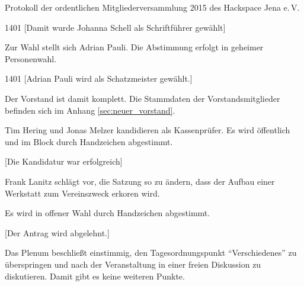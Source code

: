 \documentclass[ngerman]{scrartcl}
\begin{document}
\begin{Protokoll}{Protokoll der ordentlichen Mitgliederversammlung 2015 des Hackspace Jena e.\,V.}
\begin{Abstimmung}
  {14}{0}{1}
  [Damit wurde Johanna Schell als Schriftführer gewählt]
\end{Abstimmung}



Zur Wahl stellt sich Adrian Pauli. Die Abstimmung erfolgt in geheimer Personenwahl.

\begin{Abstimmung}
  {14}{0}{1}
  [Adrian Pauli wird als Schatzmeister gewählt.]
\end{Abstimmung}


Der Vorstand ist damit komplett.
Die Stammdaten der Vorstandsmitglieder befinden sich im Anhang \ref{sec:neuer_vorstand}.


Tim Hering und Jonas Melzer kandidieren als Kassenprüfer. Es wird
öffentlich und im Block durch Handzeichen abgestimmt.
\begin{Abstimmung}
  [Die Kandidatur war erfolgreich]
\end{Abstimmung}



Frank Lanitz schlägt vor, die Satzung so zu ändern, dass der Aufbau einer
Werkstatt zum Vereinszweck erkoren wird.

Es wird in offener Wahl durch Handzeichen abgestimmt.

\begin{Abstimmung}
  [Der Antrag wird
  abgelehnt.]
\end{Abstimmung}


Das Plenum beschließt einstimmig, den Tagesordnungspunkt
``Verschiedenes'' zu überspringen und nach der Veranstaltung in einer
freien Diskussion zu diskutieren. Damit gibt es keine weiteren Punkte.


\end{Protokoll}
\end{document}
